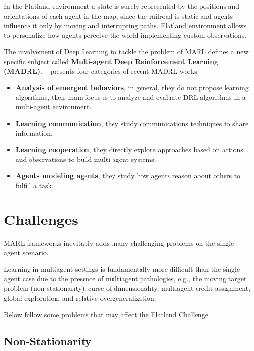\documentclass[11pt, a4paper, hidelinks]{report}
\begin{document}
In the Flatland environment a state is surely represented by the positions and orientations of each agent in the map, since the railroad is static and agents influence it only by moving and interrupting paths.
Flatland environment allows to personalize how agents perceive the world implementing custom observations.

The involvement of Deep Learning to tackle the problem of MARL defines a new specific subject called \textbf{Multi-agent Deep Reinforcement Learning (MADRL)}.
~\citep{Hernandez-Leal-2019} presents four categories of recent MADRL works:
\begin{itemize}
	\item \textbf{Analysis of emergent behaviors}, in general, they do not propose learning algorithms, their main focus is to analyze and evaluate DRL algorithms in a multi-agent environment.
	\item \textbf{Learning communication}, they study communications techniques to share information.
	\item \textbf{Learning cooperation}, they directly explore approaches based on actions and observations to build multi-agent systems.
	\item \textbf{Agents modeling agents}, they study how agents reason about others to fulfill a task.
\end{itemize}

\section{Challenges}\label{sec:challenges}

MARL frameworks inevitably adds many challenging problems on the single-agent scenario.
\begin{quoting}[font=itshape, begintext={"}, endtext={"\citep{Hernandez-Leal-2019}}]
Learning in multiagent settings is fundamentally more difficult than the single-agent case due to the presence of multiagent pathologies, e.g., the moving target problem (non-stationarity), curse of dimensionality, multiagent credit assignment, global exploration, and relative overgeneralization.
\end{quoting}

Below follow some problems that may affect the Flatland Challenge.

\subsection{Non-Stationarity}\label{subsec:non-stationarity}
\end{document}
